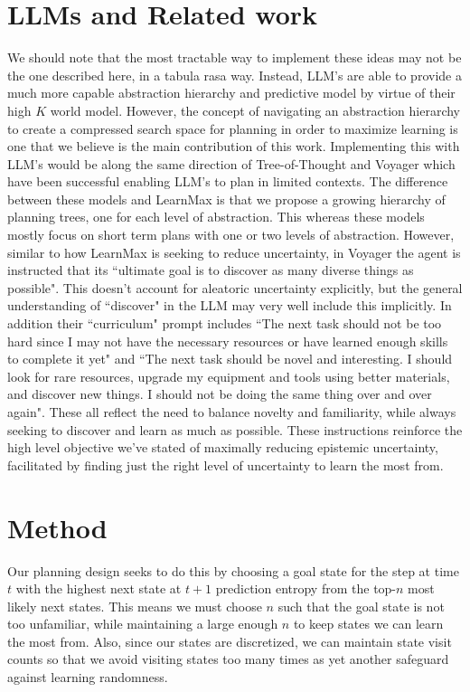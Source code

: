 \documentclass{article}
\begin{document}
\section{LLMs and Related work}
\label{sec:llm-related}

We should note that the most tractable way to implement these ideas may not be the one described here, in a tabula rasa way. Instead, LLM's \cite{openai2023gpt4} are able to provide a much more capable abstraction hierarchy and predictive model by virtue of their high $K$ world model. However, the concept of navigating an abstraction hierarchy to create a compressed search space for planning in order to maximize learning is one that we believe is the main contribution of this work. Implementing this with LLM's would be along the same direction of Tree-of-Thought \cite{yao2023tree} and Voyager \cite{wang2023voyager} which have been successful enabling LLM's to plan in limited contexts. The difference between these models and LearnMax is that we propose a growing hierarchy of planning trees, one for each level of abstraction. This whereas these models mostly focus on short term plans with one or two levels of abstraction. However, similar to how LearnMax is seeking to reduce uncertainty, in Voyager the agent is instructed that its \textquotedblleft ultimate goal is to discover as many diverse things as possible". This doesn't account for aleatoric uncertainty explicitly, but the general understanding of \textquotedblleft discover" in the LLM may very well include this implicitly. In addition their \textquotedblleft curriculum" prompt includes \textquotedblleft The next task should not be too hard since I may not have the necessary resources or have learned enough skills to complete it yet" and \textquotedblleft The next task should be novel and interesting. I should look for rare resources, upgrade my equipment and tools using better materials, and discover new things. I should not be doing the same thing over and over again". These all reflect the need to balance novelty and familiarity, while always seeking to discover and learn as much as possible. These instructions reinforce the high level objective we've stated of maximally reducing epistemic uncertainty, facilitated by finding just the right level of uncertainty to learn the most from.

\section{Method}

Our planning design seeks to do this by choosing a goal state for the step at time $t$ with the highest next state at $t + 1$ prediction entropy from the top-$n$ most likely next states. This means we must choose $n$ such that the goal state is not too unfamiliar, while maintaining a large enough $n$ to keep states we can learn the most from. Also, since our states are discretized, we can maintain state visit counts so that we avoid visiting states too many times as yet another safeguard against learning randomness.
\end{document}
